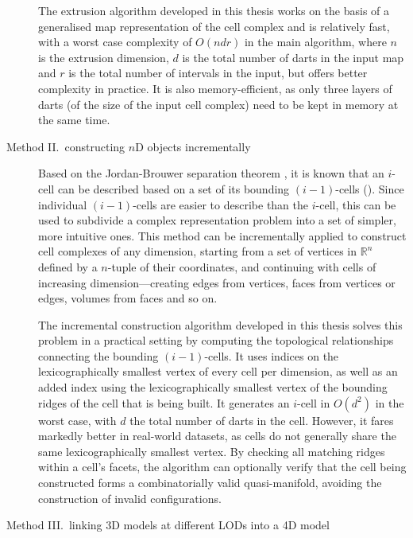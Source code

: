 \begin{description}
The extrusion algorithm developed in this thesis works on the basis of a generalised map representation of the cell complex and is relatively fast, with a worst case complexity of $O(ndr)$ in the main algorithm, where $n$ is the extrusion dimension, $d$ is the total number of darts in the input map and $r$ is the total number of intervals in the input, but offers better complexity in practice.
It is also memory-efficient, as only three layers of darts (of the size of the input cell complex) need to be kept in memory at the same time.


\item[Method II.\ constructing $n$D objects incrementally]

Based on the Jordan-Brouwer separation theorem \citep{Lebesgue11,Brouwer11}, it is known that an $i$-cell can be described based on a set of its bounding $(i-1)$-cells ().
Since individual $(i-1)$-cells are easier to describe than the $i$-cell, this can be used to subdivide a complex representation problem into a set of simpler, more intuitive ones.
This method can be incrementally applied to construct cell complexes of any dimension, starting from a set of vertices in $\mathbb{R}^n$ defined by a $n$-tuple of their coordinates, and continuing with cells of increasing dimension---creating edges from vertices, faces from vertices or edges, volumes from faces and so on.

The incremental construction algorithm developed in this thesis solves this problem in a practical setting by computing the topological relationships connecting the bounding $(i-1)$-cells.
It uses indices on the lexicographically smallest vertex of every cell per dimension, as well as an added index using the lexicographically smallest vertex of the bounding ridges of the cell that is being built.
It generates an $i$-cell in $O(d^{2})$ in the worst case, with $d$ the total number of darts in the cell.
However, it fares markedly better in real-world datasets, as cells do not generally share the same lexicographically smallest vertex.
By checking all matching ridges within a cell's facets, the algorithm can optionally verify that the cell being constructed forms a combinatorially valid quasi-manifold, avoiding the construction of invalid configurations.


\item[Method III.\ linking 3D models at different LODs into a 4D model]


\end{description}
